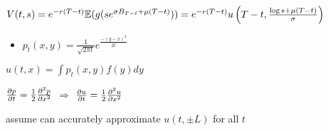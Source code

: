 \begin{fact}
    $V(t, s) = e^{-r(T-t)}\mathbb{E}(g(se^{\sigma B_{T-t} + \mu(T - t)})) = e^{-r(T-t)}u\left(T-t, \frac{\log s + \mu(T-t) }{\sigma}\right)$
\end{fact}

\begin{itemize}
    \item $p_t(x, y) = \frac{1}{\sqrt{2\pi t}}e^{\frac{-(y - x)^2}{2t}}$
\end{itemize}

\begin{fact}
    $u(t,x) = \int p_t(x, y)f(y)dy$
\end{fact}

\begin{fact}
    $\pdv{p}{t} = \frac{1}{2} \pdv[2]{p}{x}$ $\Rightarrow$ $\pdv{u}{t} = \frac{1}{2} \pdv[2]{u}{x}$
\end{fact}


\begin{setting}
    assume can accurately approximate $u(t, \pm L)$ for all $t$
\end{setting}

